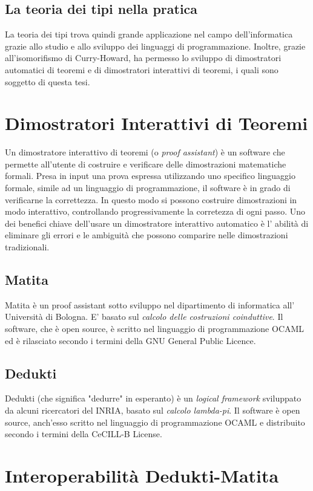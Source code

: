 \documentclass[12pt,a4paper]{report}
\begin{document}
\subsection{La teoria dei tipi nella pratica}
La teoria dei tipi trova quindi grande applicazione nel campo dell'informatica
grazie allo studio e allo sviluppo dei linguaggi di programmazione. Inoltre,
grazie all'isomorifismo di Curry-Howard, ha permesso lo sviluppo di dimostratori
automatici di teoremi e di dimostratori interattivi di teoremi, i quali sono
soggetto di questa tesi.

\section{Dimostratori Interattivi di Teoremi}
Un dimostratore interattivo di teoremi (o \textit{proof assistant}) è un software 
che permette all'utente di costruire e verificare delle dimostrazioni matematiche
formali. Presa in input una prova espressa utilizzando uno specifico linguaggio 
formale, simile ad un linguaggio di programmazione, il software è in grado di
verificarne la correttezza. In questo modo si possono costruire dimostrazioni
in modo interattivo, controllando progressivamente la corretezza di ogni passo.
Uno dei benefici chiave dell'usare un dimostratore interattivo automatico è l'
abilità di eliminare gli errori e le ambiguità che possono comparire nelle 
dimostrazioni tradizionali.

\subsection{Matita}
Matita è un  proof assistant sotto sviluppo nel dipartimento di informatica all'
Università di Bologna. E' basato sul \textit{calcolo delle costruzioni coinduttive}.
Il software, che è open source, è scritto nel linguaggio di programmazione OCAML 
ed è rilasciato secondo i termini della GNU General Public Licence.

\subsection{Dedukti}
Dedukti (che significa "dedurre" in esperanto) è un \textit{logical framework}
sviluppato da alcuni ricercatori del INRIA, basato sul \textit{calcolo lambda-pi}.
Il software è open source, anch'esso scritto nel linguaggio di programmazione OCAML
e distribuito secondo i termini della CeCILL-B License.

\section{Interoperabilità Dedukti-Matita}
\end{document}
